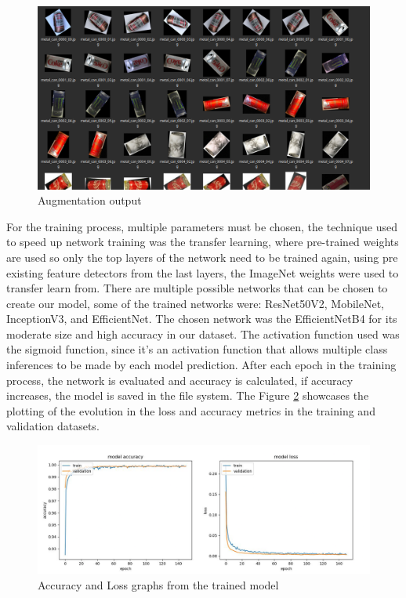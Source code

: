 \documentclass[a4paper,11pt]{article}
\begin{document}
\begin{figure}[H]
  \centering
  \includegraphics[scale=0.3]{Figures/Training directory example.png}
  \caption{\small{Augmentation output}}
  \label{fig:augmentation_example}
\end{figure}

For the training process, multiple parameters must be chosen, the technique used to speed up network training was the transfer learning, where pre-trained weights are used so only the top layers of the network need to be trained again, using pre existing feature detectors from the last layers, the ImageNet weights were used to transfer learn from. There are multiple possible networks that can be chosen to create our model, some of the trained networks were: ResNet50V2, MobileNet, InceptionV3, and EfficientNet. The chosen network was the EfficientNetB4 for its moderate size and high accuracy in our dataset. The activation function used was the sigmoid function, since it’s an activation function that allows multiple class inferences to be made by each model prediction. After each epoch in the training process, the network is evaluated and accuracy is calculated, if accuracy increases, the model is saved in the file system. The Figure \ref{fig:training_model} showcases the plotting of the evolution in the loss and accuracy metrics in the training and validation datasets.

\begin{figure}[H]
  \centering
  \includegraphics[width=12.5cm]{Figures/training_result.png}
  \caption{\small{Accuracy and Loss graphs from the trained model}}
  \label{fig:training_model}
\end{figure}
\end{document}

